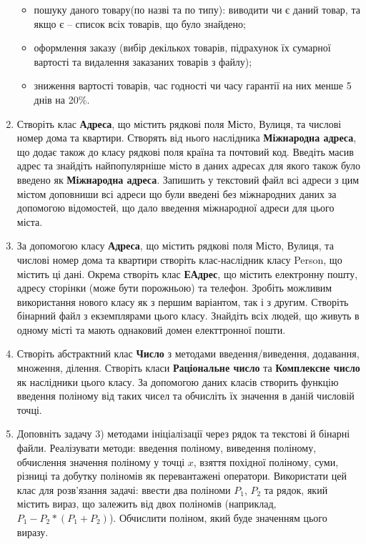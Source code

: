 \documentclass[]{article}
\begin{document}
\begin{enumerate}
  \begin{itemize}
  \item
    пошуку даного товару(по назві та по типу): виводити чи є даний
    товар, та якщо є -- список всіх товарів, що було знайдено;
  \item
    оформлення заказу (вибір декількох товарів, підрахунок їх сумарної
    вартості та видалення заказаних товарів з файлу);
  \item
    зниження вартості товарів, час годності чи часу гарантії на них
    менше 5 днів на 20\%.
  \end{itemize}
\item
  Створіть клас \textbf{Адреса}, що містить рядкові поля Місто, Вулиця,
  та числові номер дома та квартири. Створять від нього наслідника
  \textbf{Міжнародна адреса}, що додає також до класу рядкові поля
  країна та почтовий код. Введіть масив адрес та знайдіть найпопулярніше
  місто в даних адресах для якого також було введено як
  \textbf{Міжнародна адреса}. Запишить у текстовий файл всі адреси з цим
  містом доповниши всі адреси що були введені без міжнародних даних за
  допомогою відомостей, що дало введення міжнародної адреси для цього
  міста.
\item
  За допомогою класу \textbf{Адреса}, що містить рядкові поля Місто,
  Вулиця, та числові номер дома та квартири створіть клас-наслідник
  класу Person, що містить ці дані. Окрема створіть клас
  \textbf{ЕАдрес}, що містить електронну пошту, адресу сторінки (може
  бути порожньою) та телефон. Зробіть можливим використання нового класу
  як з першим варіантом, так і з другим. Створіть бінарний файл з
  екземплярами цього класу. Знайдіть всіх людей, що живуть в одному
  місті та мають однаковий домен електтронної пошти.
\item
  Створіть абстрактний клас \textbf{Число} з методами
  введення/виведення, додавання, множення, ділення. Створіть класи
  \textbf{Раціональне число} та \textbf{Комплексне число} як наслідники
  цього класу. За допомогою даних класів створить функцію введення
  поліному від таких чисел та обчисліть їх значення в даній числовій
  точці.
\item
  Доповніть задачу 3) методами ініціалізації через рядок та текстові й
  бінарні файли. Реалізувати методи: введення поліному, виведення
  поліному, обчислення значення поліному у точці \(x\), взяття похідної
  поліному, суми, різниці та добутку поліномів як перевантажені
  оператори. Використати цей клас для розв'язання задачі: ввести два
  поліноми \(P_{1}\), \(P_{2}\) та рядок, який містить вираз, що
  залежить від двох поліномів (наприклад,
  \(P_{1} - P_{2}*(P_{1} + P_{2})\)). Обчислити поліном, який буде
  значенням цього виразу.
\end{enumerate}
\end{document}
